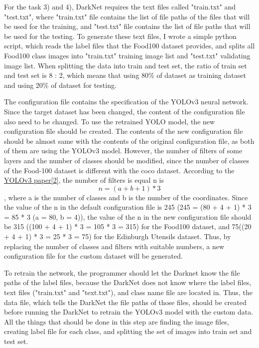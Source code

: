 \documentclass{article}
\begin{document}
For the task 3) and 4), DarkNet requires the text files called "train.txt" and "test.txt", where "train.txt" file contains the list of file paths of the files that will be used for the training, and "test.txt" file contains the list of file paths that will be used for the testing. To generate these text files, I wrote a simple python script, which reads the label files that the Food100 dataset provides, and splits all Food100 class images into "train.txt" training image list and "test.txt" validating image list. When splitting the data into train and test set, the ratio of train set and test set is 8 : 2, which means that using 80\% of dataset as training dataset and using 20\% of dataset for testing.

The configuration file contains the specification of the YOLOv3 neural network. Since the target dataset has been changed, the content of the configuration file also need to be changed. To use the retrained YOLO model, the new configuration file should be created. The contents of the new configuration file should be almost same with the contents of the original configuration file, as both of them are using the YOLOv3 model. However, the number of filters of some layers and the number of classes should be modified, since the number of classes of the Food-100 dataset is different with the coco dataset. According to the \hyperlink{ref2}{YOLOv3 paper[2]}, the number of filters is equal n is $$n = (a + b + 1) * 3$$, where a is the number of classes and b is the number of the coordinates. Since the value of the n in the default configuration file is 245 (245 = (80 + 4 + 1) * 3 = 85 * 3  (a = 80, b = 4)), the value of the n in the new configuration file should be 315 ((100 + 4 + 1) * 3 = 105 * 3 = 315) for the Food100 dataset, and 75((20 + 4 + 1) * 3 = 25 * 3 = 75) for the Edinburgh Utensils dataset. Thus, by replacing the number of classes and filters with suitable numbers, a new configuration file for the custom dataset will be generated.

To retrain the network, the programmer should let the Darknet know the file paths of the label files, because the DarkNet does not know where the label files, text files ("train.txt" and "text.txt"), and class name file are located in. Thus, the data file, which tells the DarkNet the file paths of those files, should be created before running the DarkNet to retrain the YOLOv3 model with the custom data. All the things that should be done in this step are finding the image files, creating label file for each class, and splitting the set of images into train set and test set.
\end{document}
